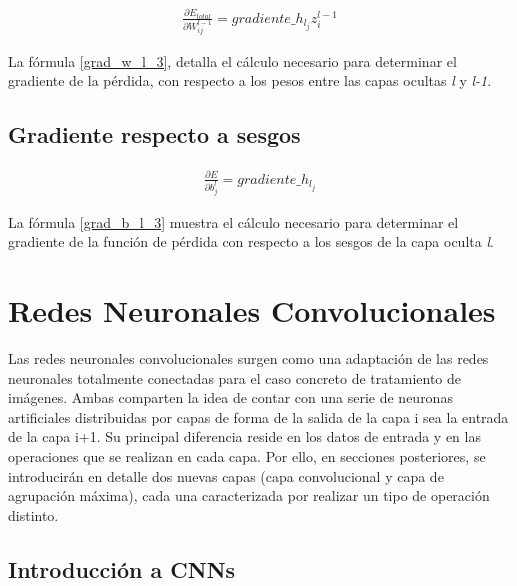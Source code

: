 \begin{gather}
	\frac{\partial E_{total} }{\partial W^{l-1}_{ij} } = gradiente\_h_{l_j} z^{l-1}_i \label{grad_w_l_3}
\end{gather}

La fórmula \ref{grad_w_l_3}, detalla el cálculo necesario para determinar el gradiente de la pérdida, con respecto a los pesos entre las capas ocultas \textit{l} y \textit{l-1}.

\subsection{Gradiente respecto a sesgos}

\begin{gather}
	\frac{\partial E}{\partial b^l_j} = gradiente\_h_{l_j} \label{grad_b_l_3}
\end{gather}

La fórmula \ref{grad_b_l_3} muestra el cálculo necesario para determinar el gradiente de la función de pérdida con respecto a los sesgos de la capa oculta \textit{l}.



\section{Redes Neuronales Convolucionales}

Las redes neuronales convolucionales \cite{CNN_definicion} surgen como una adaptación de las redes neuronales totalmente conectadas para el caso concreto de tratamiento de imágenes. Ambas comparten la idea de contar con una serie de neuronas artificiales distribuidas por capas de forma de la salida de la capa i sea la entrada de la capa i+1. Su principal diferencia reside en los datos de entrada y en las operaciones que se realizan en cada capa. Por ello, en secciones posteriores, se introducirán en detalle dos nuevas capas (capa convolucional y capa de agrupación máxima), cada una caracterizada por realizar un tipo de operación distinto.

\subsection{Introducción a CNNs \label{intro_CNN}}

